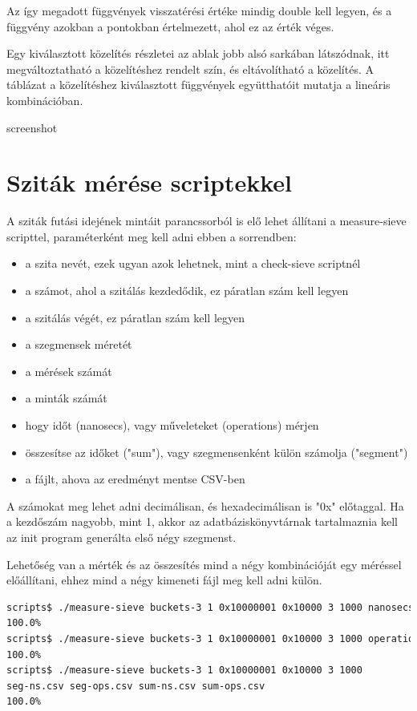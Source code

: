 \documentclass[12pt]{report}
\begin{document}
Az így megadott függvények visszatérési értéke mindig double kell legyen,
és a függvény azokban a pontokban értelmezett, ahol ez az érték véges.

Egy kiválasztott közelítés részletei az ablak jobb alsó sarkában látszódnak,
itt megváltoztatható a közelítéshez rendelt szín, és eltávolítható a közelítés.
A táblázat a közelítéshez kiválasztott függvények együtthatóit mutatja
a lineáris kombinációban.

{\color{red}screenshot}

\section{Sziták mérése scriptekkel}

A sziták futási idejének mintáit parancssorból is elő lehet állítani
a measure-sieve scripttel, paraméterként meg kell adni ebben a sorrendben:

\begin{itemize}
\item a szita nevét, ezek ugyan azok lehetnek, mint a check-sieve scriptnél
\item a számot, ahol a szitálás kezdedődik, ez páratlan szám kell legyen
\item a szitálás végét, ez páratlan szám kell legyen
\item a szegmensek méretét
\item a mérések számát
\item a minták számát
\item hogy időt (nanosecs), vagy műveleteket (operations) mérjen
\item összesítse az időket ("sum"), vagy szegmensenként külön számolja ("segment")
\item a fájlt, ahova az eredményt mentse CSV-ben
\end{itemize}

A számokat meg lehet adni decimálisan, és hexadecimálisan is "0x" előtaggal.
Ha a kezdőszám nagyobb, mint 1, akkor az adatbáziskönyvtárnak tartalmaznia
kell az init program generálta első négy szegmenst.

Lehetőség van a mérték és az összesítés mind a négy kombinációját egy
méréssel előállítani, ehhez mind a négy kimeneti fájl meg kell adni külön.

{\tiny
\begin{lstlisting}[language=bash]
scripts$ ./measure-sieve buckets-3 1 0x10000001 0x10000 3 1000 nanosecs sum out1.csv
100.0%
scripts$ ./measure-sieve buckets-3 1 0x10000001 0x10000 3 1000 operations segment out2.csv
100.0%
scripts$ ./measure-sieve buckets-3 1 0x10000001 0x10000 3 1000
seg-ns.csv seg-ops.csv sum-ns.csv sum-ops.csv
100.0%
\end{lstlisting}
}
\end{document}
